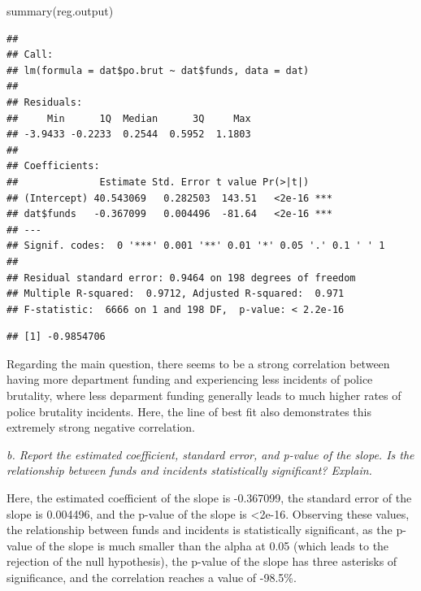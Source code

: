 \documentclass[
]{article}
\newenvironment{Shaded}{\begin{snugshade}}{\end{snugshade}}
\newcommand{\FunctionTok}[1]{\textcolor[rgb]{0.00,0.00,0.00}{#1}}
\newcommand{\NormalTok}[1]{#1}
\newcommand{\SpecialCharTok}[1]{\textcolor[rgb]{0.00,0.00,0.00}{#1}}
\begin{document}
\begin{Shaded}
\begin{Highlighting}[]
\FunctionTok{summary}\NormalTok{(reg.output)}
\end{Highlighting}
\end{Shaded}

\begin{verbatim}
## 
## Call:
## lm(formula = dat$po.brut ~ dat$funds, data = dat)
## 
## Residuals:
##     Min      1Q  Median      3Q     Max 
## -3.9433 -0.2233  0.2544  0.5952  1.1803 
## 
## Coefficients:
##              Estimate Std. Error t value Pr(>|t|)    
## (Intercept) 40.543069   0.282503  143.51   <2e-16 ***
## dat$funds   -0.367099   0.004496  -81.64   <2e-16 ***
## ---
## Signif. codes:  0 '***' 0.001 '**' 0.01 '*' 0.05 '.' 0.1 ' ' 1
## 
## Residual standard error: 0.9464 on 198 degrees of freedom
## Multiple R-squared:  0.9712, Adjusted R-squared:  0.971 
## F-statistic:  6666 on 1 and 198 DF,  p-value: < 2.2e-16
\end{verbatim}

\begin{Shaded}
\end{Shaded}

\begin{verbatim}
## [1] -0.9854706
\end{verbatim}

Regarding the main question, there seems to be a strong correlation
between having more department funding and experiencing less incidents
of police brutality, where less deparment funding generally leads to
much higher rates of police brutality incidents. Here, the line of best
fit also demonstrates this extremely strong negative correlation.

\emph{b. Report the estimated coefficient, standard error, and p-value
of the slope. Is the relationship between funds and incidents
statistically significant? Explain.}

Here, the estimated coefficient of the slope is -0.367099, the standard
error of the slope is 0.004496, and the p-value of the slope is
\textless2e-16. Observing these values, the relationship between funds
and incidents is statistically significant, as the p-value of the slope
is much smaller than the alpha at 0.05 (which leads to the rejection of
the null hypothesis), the p-value of the slope has three asterisks of
significance, and the correlation reaches a value of -98.5\%.
\end{document}
